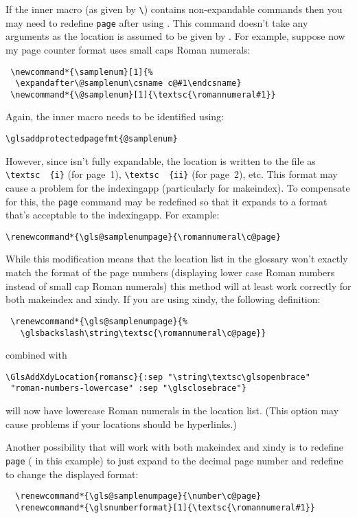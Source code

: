 \documentclass[report,inlinetitle]{nlctdoc}
\newcounter{sample}
\begin{document}
If the inner macro (as given by \verb|\|) contains
non-expandable commands then you may need to redefine
\texttt{page} after using
. This command doesn't take any arguments
as the location is assumed to be given by . For example, 
suppose now my page counter format uses small caps Roman numerals:
\begin{verbatim}
 \newcommand*{\samplenum}[1]{%
  \expandafter\@samplenum\csname c@#1\endcsname}
 \newcommand*{\@samplenum}[1]{\textsc{\romannumeral#1}}
\end{verbatim}
Again, the inner macro needs to be identified using:
\begin{verbatim}
\glsaddprotectedpagefmt{@samplenum}
\end{verbatim}
However, since  isn't fully expandable, the location
is written to the file as \verb|\textsc  {i}| (for page~1), 
\verb|\textsc  {ii}| (for page~2), etc. This format may cause a problem for
the \gls{indexingapp} (particularly for \gls{makeindex}).
To compensate for this, the \texttt{page} command may be redefined so that it expands to a
format that's acceptable to the \gls*{indexingapp}. For example:
\begin{verbatim}
\renewcommand*{\gls@samplenumpage}{\romannumeral\c@page}
\end{verbatim}
While this modification means that the location list in the glossary
won't exactly match the format of the page numbers (displaying
lower case Roman numbers instead of small cap Roman numerals)
this method will at least work correctly for both \gls{makeindex}
and \gls{xindy}. If you are using \gls{xindy}, the following
definition:
\begin{verbatim}
 \renewcommand*{\gls@samplenumpage}{%
   \glsbackslash\string\textsc{\romannumeral\c@page}}
\end{verbatim}
combined with
\begin{verbatim}
\GlsAddXdyLocation{romansc}{:sep "\string\textsc\glsopenbrace"
 "roman-numbers-lowercase" :sep "\glsclosebrace"}
\end{verbatim}
will now have lowercase Roman numerals in the location list.
(This option may cause problems if your locations should be
hyperlinks.)

Another possibility that will work with both \gls{makeindex} and
\gls{xindy} is to redefine \texttt{page} ( in this example)
to just expand to the decimal page number and redefine
 to change the displayed format:
\begin{verbatim}
  \renewcommand*{\gls@samplenumpage}{\number\c@page}
  \renewcommand*{\glsnumberformat}[1]{\textsc{\romannumeral#1}}
\end{verbatim}
\end{document}
